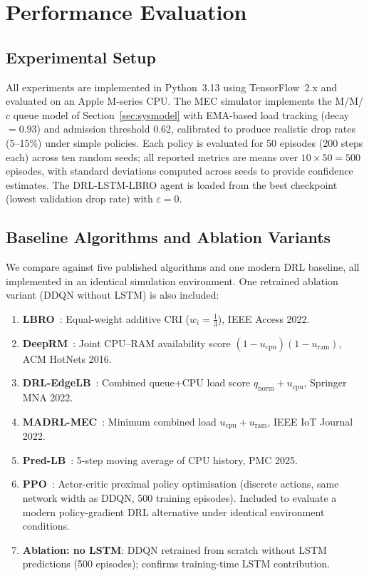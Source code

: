 \documentclass[conference]{IEEEtran}
\begin{document}
\section{Performance Evaluation}
\label{sec:eval}

\subsection{Experimental Setup}

All experiments are implemented in Python~3.13 using TensorFlow~2.x and
evaluated on an Apple M-series CPU. The MEC simulator implements the
M/M/$c$ queue model of Section~\ref{sec:sysmodel} with EMA-based load
tracking (decay $= 0.93$) and admission threshold 0.62, calibrated to
produce realistic drop rates (5--15\%) under simple policies. Each policy is evaluated for 50 episodes (200 steps each) across ten
random seeds; all reported metrics are means over
$10\times50 = 500$ episodes, with standard deviations
computed across seeds to provide confidence estimates. The DRL-LSTM-LBRO agent is
loaded from the best checkpoint (lowest validation drop rate) with
$\varepsilon = 0$.

\subsection{Baseline Algorithms and Ablation Variants}

We compare against five published algorithms and one modern DRL baseline,
all implemented in an identical simulation environment. One retrained
ablation variant (DDQN without LSTM) is also included:

\begin{enumerate}
    \item \textbf{LBRO}~\cite{nayyer2022lbro}: Equal-weight additive CRI
    ($w_i{=}\tfrac{1}{3}$), IEEE Access 2022.
    \item \textbf{DeepRM}~\cite{mao2016resource}: Joint CPU--RAM
    availability score $(1-u_{\text{cpu}})(1-u_{\text{ram}})$,
    ACM HotNets 2016.
    \item \textbf{DRL-EdgeLB}~\cite{liu2022edgelb}: Combined
    queue+CPU load score $q_{\text{norm}} + u_{\text{cpu}}$,
    Springer MNA 2022.
    \item \textbf{MADRL-MEC}~\cite{zhao2022madrl}: Minimum combined
    load $u_{\text{cpu}} + u_{\text{ram}}$, IEEE IoT Journal 2022.
    \item \textbf{Pred-LB}~\cite{predlb2025}: 5-step moving average
    of CPU history, PMC 2025.
    \item \textbf{PPO}~\cite{schulman2017ppo}: Actor-critic proximal
    policy optimisation (discrete actions, same network width as DDQN,
    500 training episodes). Included to evaluate a modern policy-gradient
    DRL alternative under identical environment conditions.
    \item \textbf{Ablation: no LSTM}: DDQN retrained from scratch
    without LSTM predictions (500 episodes); confirms training-time
    LSTM contribution.
\end{enumerate}
\end{document}
